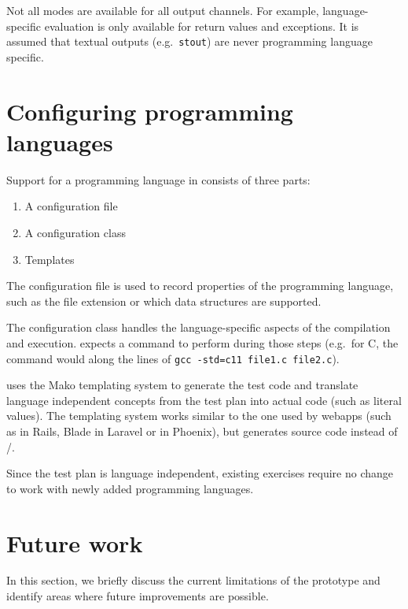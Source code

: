 \documentclass[5p,number]{elsarticle}
\begin{document}
    Not all modes are available for all output channels.
    For example, language-specific evaluation is only available for return values and exceptions.
    It is assumed that textual outputs (e.g.\ \texttt{stout}) are never programming language specific.

    \section{Configuring programming languages}\label{sec:configuring-programming-languages}

    Support for a programming language in \tested{} consists of three parts:

    \begin{enumerate}
        \item A configuration file
        \item A configuration class
        \item Templates
    \end{enumerate}

    The configuration file is used to record properties of the programming language, such as the file extension or which data structures are supported.

    The configuration class handles the language-specific aspects of the compilation and execution.
    \tested{} expects a command to perform during those steps (e.g.\ for C, the command would along the lines of \texttt{gcc -std=c11 file1.c file2.c}).
    
    \tested{} uses the Mako templating system \cite{mako} to generate the test code and translate language independent concepts from the test plan into actual code (such as literal values).
    The templating system works similar to the one used by webapps (such as  in Rails, Blade in Laravel or  in Phoenix), but generates source code instead of /.
    
    Since the test plan is language independent, existing exercises require no change to work with newly added programming languages.
    
    \section{Future work}\label{sec:future-work}
    
    In this section, we briefly discuss the current limitations of the prototype and identify areas where future improvements are possible.
    
\end{document}
